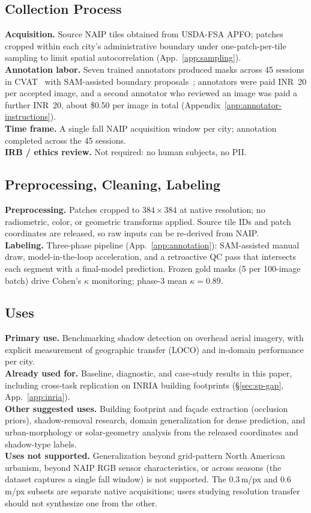 \subsection{Collection Process}
\textbf{Acquisition.} Source NAIP tiles obtained from USDA-FSA APFO; patches cropped
within each city's administrative boundary under one-patch-per-tile sampling to
limit spatial autocorrelation (App.~\ref{app:sampling}).\\
\textbf{Annotation labor.} Seven trained annotators produced masks across 45
sessions in CVAT~\citep{cvat} with SAM-assisted boundary proposals~\citep{sam};
annotators were paid INR~20 per accepted image, and a second annotator who reviewed an image was paid a further INR~20, about \$0.50 per image in total (Appendix~\ref{app:annotator-instructions}).\\
\textbf{Time frame.} A single fall NAIP acquisition window per city; annotation
completed across the 45 sessions.\\
\textbf{IRB / ethics review.} Not required: no human subjects, no PII.

\subsection{Preprocessing, Cleaning, Labeling}
\textbf{Preprocessing.} Patches cropped to $384\!\times\!384$ at native resolution;
no radiometric, color, or geometric transforms applied. Source tile IDs and patch
coordinates are released, so raw inputs can be re-derived from NAIP.\\
\textbf{Labeling.} Three-phase pipeline (App.~\ref{app:annotation}): SAM-assisted
manual draw, model-in-the-loop acceleration, and a retroactive QC pass that
intersects each segment with a final-model prediction. Frozen gold masks
(5 per 100-image batch) drive Cohen's $\kappa$ monitoring; phase-3 mean $\kappa = 0.89$.

\subsection{Uses}
\textbf{Primary use.} Benchmarking shadow detection on overhead aerial imagery,
with explicit measurement of geographic transfer (LOCO) and in-domain performance
per city.\\
\textbf{Already used for.} Baseline, diagnostic, and case-study results in this
paper, including cross-task replication on INRIA building footprints
(\S\ref{sec:sp-gap}, App.~\ref{app:inria}).\\
\textbf{Other suggested uses.} Building footprint and fa\c{c}ade extraction
(occlusion priors), shadow-removal research, domain generalization for dense
prediction, and urban-morphology or solar-geometry analysis from the released
coordinates and shadow-type labels.\\
\textbf{Uses not supported.} Generalization beyond grid-pattern North American
urbanism, beyond NAIP RGB sensor characteristics, or across seasons (the dataset
captures a single fall window) is not supported. The 0.3\,m/px and 0.6\,m/px
subsets are separate native acquisitions; users studying resolution transfer
should not synthesize one from the other.

